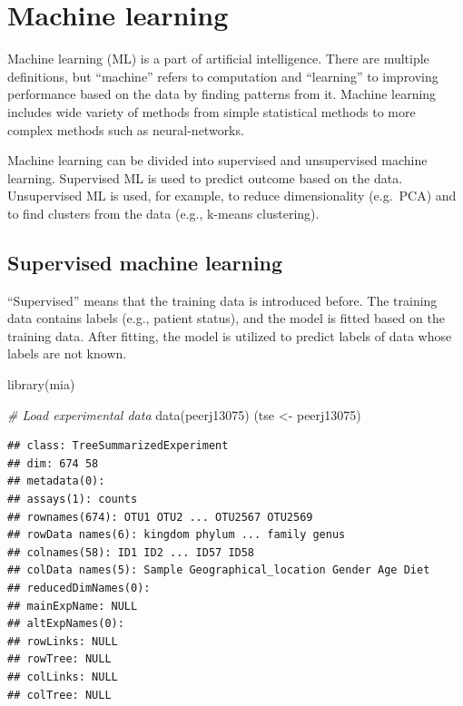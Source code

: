 \documentclass[
]{book}
\newenvironment{Shaded}{\begin{snugshade}}{\end{snugshade}}
\newcommand{\CommentTok}[1]{\textcolor[rgb]{0.56,0.35,0.01}{\textit{#1}}}
\newcommand{\FunctionTok}[1]{\textcolor[rgb]{0.00,0.00,0.00}{#1}}
\newcommand{\NormalTok}[1]{#1}
\newcommand{\OtherTok}[1]{\textcolor[rgb]{0.56,0.35,0.01}{#1}}
\begin{document}
\hypertarget{machine_learning}{%
\chapter{Machine learning}\label{machine_learning}}

Machine learning (ML) is a part of artificial intelligence. There are multiple
definitions, but ``machine'' refers to computation and ``learning'' to improving
performance based on the data by finding patterns from it. Machine learning
includes wide variety of methods from simple statistical methods to more
complex methods such as neural-networks.

Machine learning can be divided into supervised and unsupervised machine learning.
Supervised ML is used to predict outcome based on the data. Unsupervised ML is used,
for example, to reduce dimensionality (e.g.~PCA) and to find clusters from the
data (e.g., k-means clustering).

\hypertarget{supervised-machine-learning}{%
\section{Supervised machine learning}\label{supervised-machine-learning}}

``Supervised'' means that the training data is introduced before. The training data
contains labels (e.g., patient status), and the model is fitted based on the
training data. After fitting, the model is utilized to predict labels of data whose
labels are not known.

\begin{Shaded}
\begin{Highlighting}[]
\FunctionTok{library}\NormalTok{(mia)}

\CommentTok{\# Load experimental data}
\FunctionTok{data}\NormalTok{(peerj13075)}
\NormalTok{(tse }\OtherTok{\textless{}{-}}\NormalTok{ peerj13075)}
\end{Highlighting}
\end{Shaded}

\begin{verbatim}
## class: TreeSummarizedExperiment 
## dim: 674 58 
## metadata(0):
## assays(1): counts
## rownames(674): OTU1 OTU2 ... OTU2567 OTU2569
## rowData names(6): kingdom phylum ... family genus
## colnames(58): ID1 ID2 ... ID57 ID58
## colData names(5): Sample Geographical_location Gender Age Diet
## reducedDimNames(0):
## mainExpName: NULL
## altExpNames(0):
## rowLinks: NULL
## rowTree: NULL
## colLinks: NULL
## colTree: NULL
\end{verbatim}
\end{document}
